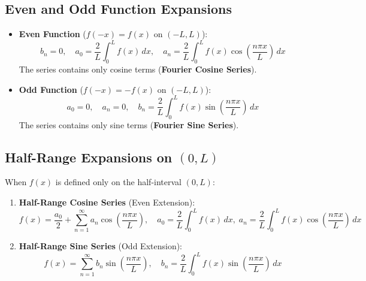 \subsection{Even and Odd Function Expansions}
\begin{itemize}[leftmargin=1.5em]
    \item \textbf{Even Function} ($f(-x) = f(x)$ on $(-L, L)$):
    \begin{equation}
    b_n = 0, \quad a_0 = \frac{2}{L}\int_0^L f(x)\,dx, \quad a_n = \frac{2}{L}\int_0^L f(x)\cos\left(\frac{n\pi x}{L}\right)\,dx
    \end{equation}
    The series contains only cosine terms (\textbf{Fourier Cosine Series}).
    \item \textbf{Odd Function} ($f(-x) = -f(x)$ on $(-L, L)$):
    \begin{equation}
    a_0 = 0, \quad a_n = 0, \quad b_n = \frac{2}{L}\int_0^L f(x)\sin\left(\frac{n\pi x}{L}\right)\,dx
    \end{equation}
    The series contains only sine terms (\textbf{Fourier Sine Series}).
\end{itemize}

\subsection{Half-Range Expansions on $(0, L)$}
When $f(x)$ is defined only on the half-interval $(0, L)$:
\begin{enumerate}[leftmargin=1.5em]
    \item \textbf{Half-Range Cosine Series} (Even Extension):
    \begin{equation}
    f(x) = \frac{a_0}{2} + \sum_{n=1}^\infty a_n \cos\left(\frac{n\pi x}{L}\right), \quad a_0 = \frac{2}{L}\int_0^L f(x)\,dx, \; a_n = \frac{2}{L}\int_0^L f(x)\cos\left(\frac{n\pi x}{L}\right)\,dx
    \end{equation}
    \item \textbf{Half-Range Sine Series} (Odd Extension):
    \begin{equation}
    f(x) = \sum_{n=1}^\infty b_n \sin\left(\frac{n\pi x}{L}\right), \quad b_n = \frac{2}{L}\int_0^L f(x)\sin\left(\frac{n\pi x}{L}\right)\,dx
    \end{equation}
\end{enumerate}


